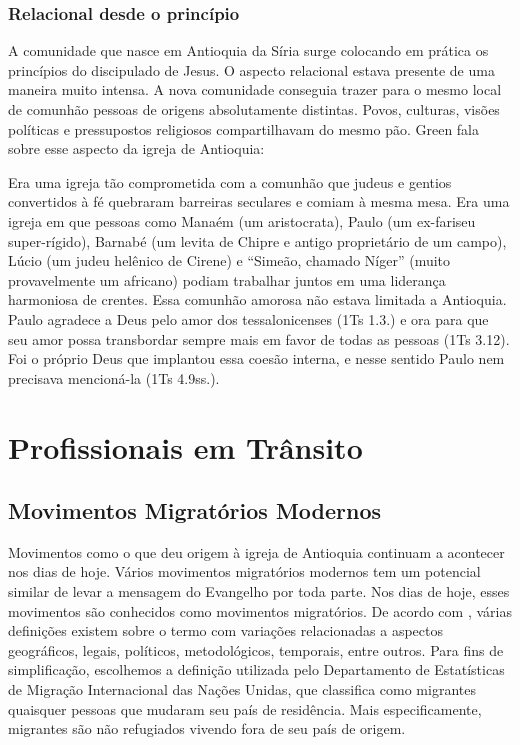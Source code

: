 \documentclass[
	12pt,				%
	openright,			%
	twoside,			%
	a4paper,			%
	english,			%
	french,				%
	spanish,			%
	brazil				%
	]{abntex2}
\begin{document}
\subsection {Relacional desde o princípio}

A comunidade que nasce em Antioquia da Síria surge colocando em prática os princípios do discipulado de Jesus. O aspecto relacional estava presente de uma maneira muito intensa. A nova comunidade conseguia trazer para o mesmo local de comunhão pessoas de origens absolutamente distintas. Povos, culturas, visões políticas e pressupostos religiosos compartilhavam do mesmo pão. Green fala sobre esse aspecto da igreja de Antioquia:

\begin{citacao}
Era uma igreja tão comprometida com a comunhão que judeus e gentios convertidos à fé quebraram barreiras seculares e comiam à mesma mesa. Era uma igreja em que pessoas como Manaém (um aristocrata), Paulo (um ex-fariseu super-rígido), Barnabé (um levita de Chipre e antigo proprietário de um campo), Lúcio (um judeu helênico de Cirene) e “Simeão, chamado Níger” (muito provavelmente um africano)
podiam trabalhar juntos em uma liderança harmoniosa de crentes. Essa comunhão amorosa não estava limitada a Antioquia. Paulo agradece a Deus pelo amor dos tessalonicenses (1Ts 1.3.) e ora para que seu amor possa transbordar sempre mais em favor de todas as pessoas (1Ts 3.12). Foi o próprio Deus que
implantou essa coesão interna, e nesse sentido Paulo nem precisava mencioná-la (1Ts 4.9ss.).
\end{citacao}\cite[261]{green}


\chapter{Profissionais em Trânsito}

\section {Movimentos Migratórios Modernos}

Movimentos como o que deu origem à igreja de Antioquia continuam a acontecer nos dias de hoje. Vários movimentos migratórios modernos tem um potencial similar de levar a mensagem do Evangelho por toda parte. Nos dias de hoje, esses movimentos são conhecidos como movimentos migratórios. De acordo com \cite{iom2020}, várias definições existem sobre o termo com variações relacionadas a aspectos geográficos, legais, políticos, metodológicos, temporais, entre outros. Para fins de simplificação, escolhemos a definição utilizada pelo Departamento de Estatísticas de Migração Internacional das Nações Unidas, que classifica como migrantes quaisquer pessoas que mudaram seu país de residência. Mais especificamente, migrantes são não refugiados vivendo fora de seu país de origem. 
\end{document}
